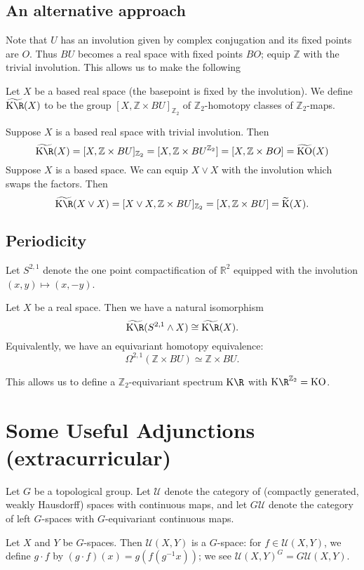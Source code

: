 \documentclass[11pt]{article}
\newcommand{\Extracurricular}[1]{
\section*{#1 {\small(extracurricular)}}
}
\begin{document}
\begin{FirstNineLectures}
\subsection*{An alternative approach}
Note that $U$ has an involution given by complex conjugation and its fixed points are $O$. Thus $BU$ becomes a real space with fixed points $BO$;  equip $\mathbb{Z}$ with the trivial involution. This allows us to make the following
\begin{defn*} Let $X$ be a based real space (the basepoint is fixed by the involution). We define $\widetilde{\KR}(X)$ to be the group $[X,\mathbb{Z}\times BU]_{\mathbb{Z}_2}$  of $\mathbb{Z}_2$-homotopy classes of $\mathbb{Z}_2$-maps.
\end{defn*}
Suppose $X$ is a based real space with trivial involution. Then \[\widetilde{\KR}(X)=[X,\mathbb{Z}\times BU]_{\mathbb{Z}_2}=[X,\mathbb{Z}\times BU^{\mathbb{Z}_2}]=[X,\mathbb{Z}\times BO]=\widetilde{\KO}(X)\]
Suppose $X$ is a based space. We can equip $X\vee X$ with the involution which swaps the factors. Then \[\widetilde{\KR}(X\vee X)=[X\vee X,\mathbb{Z}\times BU]_{\mathbb{Z}_2}=[X,\mathbb{Z}\times BU]=\widetilde{\K}(X).\]
\subsection*{Periodicity}
Let $S^{2,1}$  denote the one point compactification of $\mathbb{R}^2$ equipped with the involution $(x,y)\mapsto (x,-y)$.

\begin{thm*}
Let $X$ be a real space. Then we have a natural isomorphism
\[\widetilde{\KR}(S^{2,1}\wedge X)\cong\widetilde{\KR}(X).\] Equivalently, we have an equivariant homotopy equivalence:
\[\Omega^{2,1}(\mathbb{Z}\times BU)\simeq\mathbb{Z}\times BU.\]
\end{thm*}
\noindent This allows us to define a $\mathbb{Z}_2$-equivariant spectrum $\KR$ with $\KR^{\mathbb{Z}_2}=\KO$.

\Extracurricular{Some Useful Adjunctions}
Let $G$ be a topological group.
Let $\mathscr{U}$ denote the category of (compactly generated, weakly Hausdorff) spaces with continuous maps, and let $G\mathscr{U}$ denote the category of left $G$-spaces with $G$-equivariant continuous maps.

Let $X$ and $Y$ be $G$-spaces. Then $\mathscr{U}(X,Y)$ is a $G$-space: for $f\in\mathscr{U}(X,Y)$, we define $g\cdot f$ by  $(g\cdot f)(x)=g(f(g^{-1}x))$; we see $\mathscr{U}(X,Y)^G=G\mathscr{U}(X,Y)$.

\end{FirstNineLectures}
\end{document}
